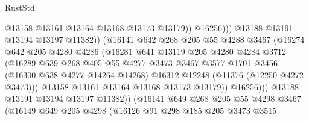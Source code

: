 \begin{lexlean}{RustStd}
\begin{coremodule}
{{{{{{{{{{{{{{{{{{{                                      @13158
                                      @13161
                                      @13164
                                      @13168
                                      @13173
                                      @13179))
                                  @16256)))
                            @13188
                            @13191
                            @13194
                            @13197
                            @11382))
                        (@16141
                          @642
                          @268
                          @205
                          @55
                          @4288
                          @3467
                          (@16274
                            @642
                            @205
                            @4280
                            @4286
                            (@16281
                              @641
                              @13119
                              @205
                              @4280
                              @4284
                              @3712
                              (@16289
                                @639
                                @268
                                @405
                                @55
                                @4277
                                @3473
                                @3467
                                @3577
                                @1701
                                @3456
                                (@16300 @638 @4277 @14264 @14268)
                                @16312
                                @12248
                                (@11376 (@12250 @4272 @3473)))
                              @13158
                              @13161
                              @13164
                              @13168
                              @13173
                              @13179))
                          @16256)))
                    @13188
                    @13191
                    @13194
                    @13197
                    @11382))
                (@16141
                  @649
                  @268
                  @205
                  @55
                  @4298
                  @3467
                  (@16149
                    @649
                    @205
                    @4298
                    (@16126
                      @91
                      @298
                      @185
                      @205
                      @3473
                      @3515
}}}}}}}}}}}}}}}}}}}
\end{coremodule}
\end{lexlean}
